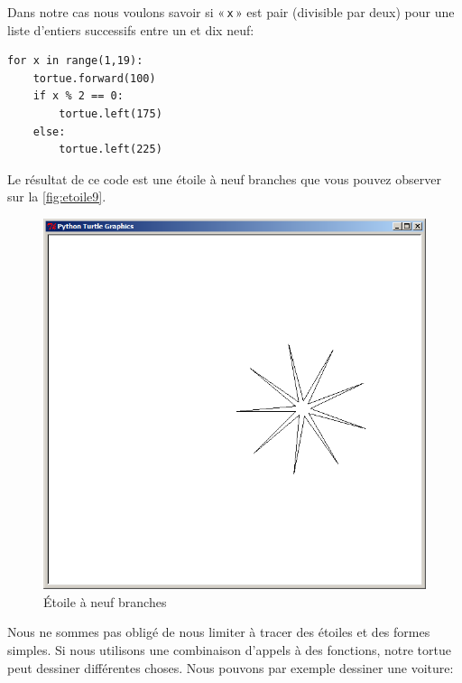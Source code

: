 Dans notre cas nous voulons savoir si « \texttt{x} »  est pair (divisible par deux) pour une liste d'entiers successifs entre un et dix neuf:

\begin{Verbatim}[frame=single,rulecolor=\color{mbleu}, label=à taper]
for x in range(1,19):
    tortue.forward(100)
    if x % 2 == 0:
        tortue.left(175)
    else:
        tortue.left(225)
\end{Verbatim}

Le résultat de ce code est une étoile à neuf branches que vous pouvez observer sur la \autoref{fig:etoile9}.

\begin{figure}[H]
\centering
\includegraphics[scale=0.4]{images/etoile9}
\caption{Étoile à neuf branches}\label{fig:etoile9}
\end{figure}

Nous ne sommes pas obligé de nous limiter à tracer des étoiles et des formes simples. Si nous utilisons une combinaison d'appels à des fonctions, notre tortue peut dessiner différentes choses. Nous pouvons par exemple dessiner une voiture:

